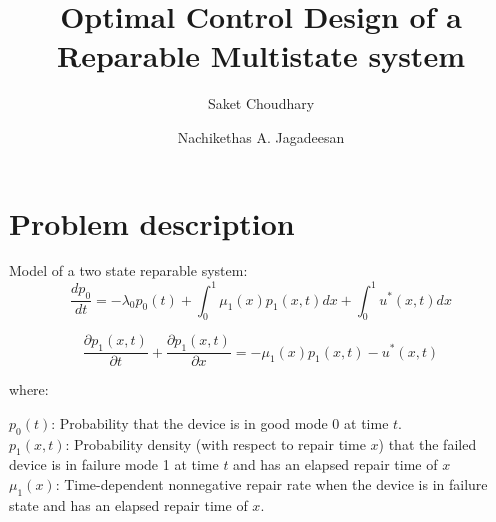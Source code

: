 \documentclass{ifacconf}
\begin{document}
\begin{frontmatter}


\title{
	Optimal Control Design of a Reparable Multistate system}%


\author[First]{Saket Choudhary} 
\author[Second]{Nachikethas A. Jagadeesan} 


\address[First]{University of Southern California, 
   LA, CA 90089 USA (e-mail: skchoudh@ usc.edu).}

\address[Second]{University of Southern California, 
   LA, CA 90089 USA (e-mail: nanantha@ usc.edu).}

\begin{abstract}                %

\end{abstract}

\begin{keyword}

\end{keyword}

\end{frontmatter}

\section{Problem description}
Model of a two state reparable system:
\begin{equation}
\label{eq1}
\frac{dp_0}{dt} = -\lambda_0 p_0(t) + \int_0^1 \mu_1(x)p_1(x,t)dx + \int_0^1u^{*}(x,t)dx
\end{equation}

\begin{equation}
\label{eq2}
\frac{\partial p_1(x,t)}{\partial t} + \frac{\partial p_1(x,t)}{\partial x} = -\mu_1(x)p_1(x,t) - u^{*}(x,t)
\end{equation}

where:

$p_0(t)$: Probability that the device is in good mode 0 at time $t$.\\

$p_1(x,t)$: Probability density (with respect to repair time $x$) that the failed device is in failure mode 1 at time $t$ and has an elapsed repair time of $x$\\

$\mu_1(x)$: Time-dependent nonnegative repair rate when the device is in failure state and has an elapsed repair time of $x$.
\end{document}
